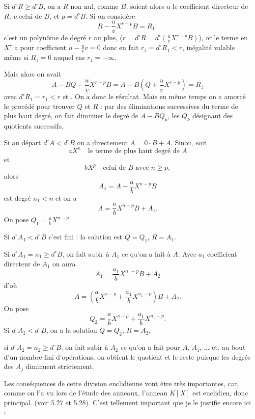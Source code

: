 Si $d^\circ R\ge d^\circ B$, on a $R$ non nul, comme $B$, soient alors $u$ le coefficient directeur de $R$, $v$ celui de $B$, et $p=d^\circ B$. Si on considère
\[
R-\frac uv X^{r-p}B=R_1 :
\]
c'est un polynôme de degré $r$ au plus, ($r=d^\circ R=d^\circ(\frac uvX^{r-p}B)$), or le terme en $X^r$ a pour coefficient $u-\frac uvv=0$ donc en fait $r_1=d^\circ R_1<r$, inégalité valable même si $R_1=0$ auquel cas $r_1=-\infty$.

Mais alors on avait
\[
A-BQ-\frac uvX^{r-p}B=A-B\left(Q+\frac uvX^{r-p}\right)=R_1
\]
avec $d^\circ R_1=r_1<r$ et . On a donc le résultat. Mais en même temps on a amorcé le procédé pour trouver $Q$ et $R$ : par des éliminations successives du terme de plus haut degré, on fait diminuer le degré de $A-BQ_k$, les $Q_k$ désignant des quotients successifs.

Si au départ $d^\circ A<d^\circ B$ on a directement $A=0\cdot B+A$. Sinon, soit
\[
aX^n\quad\text{le terme de plus haut degré de }A
\]
et
\[
bX^p\quad\text{celui de }B\text{ avec }n\ge p,
\]
alors
\[
A_1=A-\frac abX^{n-p}B
\]
est degré $n_1<n$ et on a
\[
A=\frac abX^{n-p}B+A_1.
\]
On pose $Q_1=\frac abX^{n-p}$.

Si $d^\circ A_1<d^\circ B$ c'est fini : la solution est $Q=Q_1$, $R=A_1$.

Si $d^\circ A_1=n_1\ge d^\circ B$, on fait subir à $A_1$ ce qu'on a fait à $A$. Avec $a_1$ coefficient directeur de $A_1$ on aura
\[
A_1=\frac{a_1}{b}X^{n_1-p}B+A_2
\]
d'où
\[
A=\left(\frac abX^{n-p}+\frac{a_1}{b}X^{n_1-p}\right)B+A_2.
\]
On pose
\[
Q_2=\frac abX^{n-p}+\frac{a_1}{b}X^{n_1-p}.
\]
Si $d^\circ A_2<d^\circ B$, on a la solution $Q=Q_2$, $R=A_2$,

si $d^\circ A_2=n_2\ge d^\circ B$, on fait subir à $A_2$ ce qu'on a fait pour $A$, $A_1$, ... et, au bout d'un nombre fini d'opérations, on obtient le quotient et le reste puisque les degrés des $A_j$ diminuent strictement. \bookend

Les conséquences de cette division euclidienne vont être très importantes, car, comme on l'a vu lors de l'étude des anneaux, l'anneau $K[X]$ est euclidien, donc principal. (voir 5.27 et 5.28). C'est tellement important que je le justifie encore ici :

